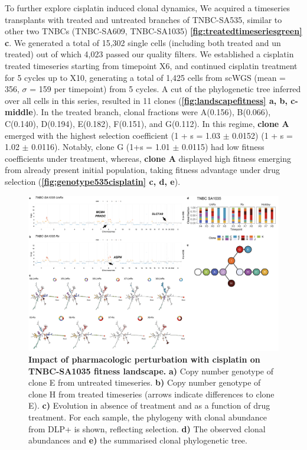  
To further explore cisplatin induced clonal dynamics, We acquired a timeseries transplants with treated and untreated branches of TNBC-SA535, similar to other two TNBCs (TNBC-SA609, TNBC-SA1035) \textbf{\autoref{fig:treatedtimeseriesgreen} c}.
We generated a total of 15,302 single cells (including both treated and un treated) out of which 4,023 passed our quality filters.
We established a cisplatin treated timeseries starting from timepoint X6, and continued cisplatin treatment for 5 cycles up to X10, generating a total of 1,425 cells from scWGS (mean = 356, $\sigma$ = 159 per timepoint) from 5 cycles. A cut of the phylogenetic tree inferred over all cells in this series, resulted in 11 clones (\textbf{\autoref{fig:landscapefitness} a, b, c-middle}). 
In the treated branch, clonal fractions were A(0.156), B(0.066), C(0.140), D(0.194), E(0.182), F(0.151), and G(0.112). In this regime, \textbf{clone A} emerged with the highest selection coefficient (1 + s = 1.03 $\pm$  0.0152) (1 + s = 1.02 $\pm$ 0.0116). Notably, clone G (1+s = 1.01 $\pm$ 0.0115) had low fitness coefficients under treatment, whereas, \textbf{clone A} displayed high fitness emerging from already present initial population, taking fitness advantage under drug selection (\textbf{\autoref{fig:genotype535cisplatin} c, d, e}).



\begin{figure}
\centering
\includegraphics[width=\textwidth]{Figures/chap4/genePlot1035.png}
\caption[Impact of pharmacologic perturbation with cisplatin on TNBC-SA1035 fitness landscape.]
	{\small
	\textbf{Impact of pharmacologic perturbation with cisplatin on TNBC-SA1035 fitness landscape.}
	    \textbf{a)} Copy number genotype of clone E from untreated timeseries. \textbf{b)} Copy number genotype of clone H from treated timeseries (arrows indicate differences to clone E). \textbf{c)}  Evolution in absence of treatment and as a function of drug treatment. For each sample, the phylogeny with clonal abundance from DLP+ is shown, reflecting selection. \textbf{d)} The observed clonal abundances and \textbf{e)} the summarised clonal phylogenetic tree.}
\label{fig:genotype1035}
\end{figure}

